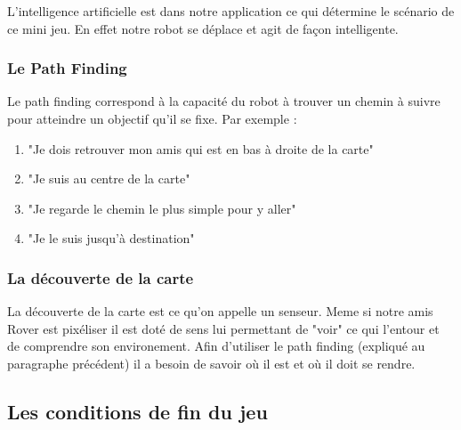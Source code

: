 \documentclass[a4paper 12pts]{article}
\begin{document}
L'intelligence artificielle est dans notre application ce qui détermine le scénario de ce mini jeu.
En effet notre robot se déplace et agit de façon intelligente.
\vspace{0.75cm}

\subsubsection{Le Path Finding}

\vspace{0.75cm}

Le path finding correspond à la capacité du robot à trouver un chemin à suivre pour atteindre un objectif qu'il se fixe.
Par exemple : 

\vspace{0.5cm}

\begin{enumerate}
\item "Je dois retrouver mon amis qui est en bas à droite de la carte"
\item "Je suis au centre de la carte"
\item "Je regarde le chemin le plus simple pour y aller"
\item "Je le suis jusqu'à destination"
\end{enumerate}

\vspace{0.75cm}

\subsubsection{La découverte de la carte}

\vspace{0.75cm}

La découverte de la carte est ce qu'on appelle un senseur.
Meme si notre amis Rover est pixéliser il est doté de sens lui permettant de "voir" ce qui l'entour et de comprendre son environement.
Afin d'utiliser le path finding (expliqué au paragraphe précédent)
il a besoin de savoir où il est et où il doit se rendre.

\vspace{0.75cm}

\subsection{Les conditions de fin du jeu}

\vspace{0.75cm}
\end{document}
